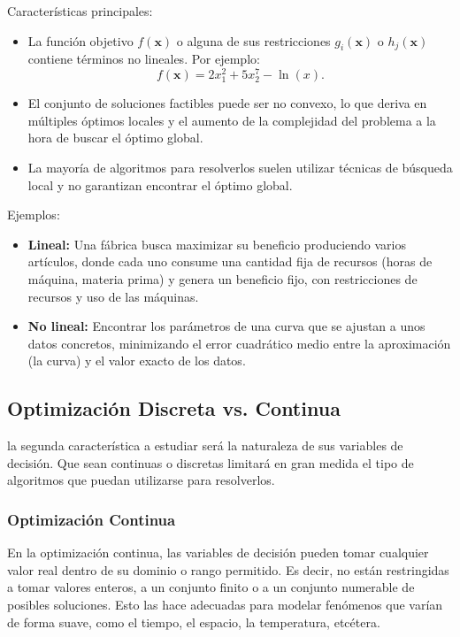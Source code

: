 \documentclass[12pt,a4paper]{book}
\begin{document}
Características principales:
\begin{itemize}
    \item La función objetivo $f(\mathbf{x})$ o alguna de sus restricciones $g_i(\mathbf{x})$ o $h_j(\mathbf{x})$ contiene términos no lineales. Por ejemplo:
    $$f(\mathbf{x})=2x_1^2+5x_2^7-\ln(x).$$
    \item El conjunto de soluciones factibles puede ser no convexo, lo que deriva en múltiples óptimos locales y el aumento de la complejidad del problema a la hora de buscar el óptimo global.
    \item La mayoría de algoritmos para resolverlos suelen utilizar técnicas de búsqueda local y no garantizan encontrar el óptimo global.
\end{itemize}

Ejemplos:
\begin{itemize}
    \item \textbf{Lineal:} Una fábrica busca maximizar su beneficio produciendo varios artículos, donde cada uno consume una cantidad fija de recursos (horas de máquina, materia prima) y genera un beneficio fijo, con restricciones de recursos y uso de las máquinas.
    \item \textbf{No lineal:} Encontrar los parámetros de una curva que se ajustan a unos datos concretos, minimizando el error cuadrático medio entre la aproximación (la curva) y el valor exacto de los datos.
\end{itemize}


\subsection{Optimización Discreta vs. Continua}
la segunda característica a estudiar será la naturaleza de sus variables de decisión. Que sean continuas o discretas
limitará en gran medida el tipo de algoritmos que puedan utilizarse para resolverlos.

\subsubsection{Optimización Continua}
En la optimización continua, las variables de decisión pueden tomar cualquier valor real dentro de su dominio o rango permitido. Es decir, no están restringidas a tomar valores enteros, a un conjunto finito o a un conjunto numerable de posibles soluciones. Esto las hace adecuadas para modelar fenómenos que varían de forma suave, como el tiempo, el espacio, la temperatura, etcétera.
\end{document}
